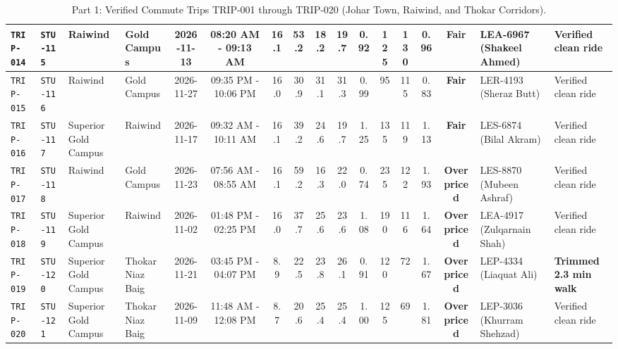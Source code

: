 \documentclass[9pt, a4paper, landscape]{article}
\begin{document}
\begin{table}[h!]
\begin{tabularx}{\textwidth}{|l|l|p{2.2cm}|p{2.3cm}|c|c|c|c|c|c|c|c|c|c|c|p{3.1cm}|X|}
\rowcolor{lightgray}\texttt{TRIP-014} & \texttt{STU-115} & Raiwind & Gold Campus & 2026-11-13 & 08:20 AM - 09:13 AM & 16.1 & 53.2 & 18.2 & 19.7 & 0.92 & 125 & 130 & 0.96 & \textcolor{accentteal}{\textbf{Fair}} & LEA-6967 (Shakeel Ahmed) & \textcolor{slate}{Verified clean ride} \\ \hline
\rowcolor{white}\texttt{TRIP-015} & \texttt{STU-116} & Raiwind & Gold Campus & 2026-11-27 & 09:35 PM - 10:06 PM & 16.0 & 30.9 & 31.1 & 31.3 & 0.99 & 95 & 115 & 0.83 & \textcolor{accentteal}{\textbf{Fair}} & LER-4193 (Sheraz Butt) & \textcolor{slate}{Verified clean ride} \\ \hline
\rowcolor{lightgray}\texttt{TRIP-016} & \texttt{STU-117} & Superior Gold Campus & Raiwind & 2026-11-17 & 09:32 AM - 10:11 AM & 16.1 & 39.2 & 24.6 & 19.7 & 1.25 & 135 & 119 & 1.13 & \textcolor{accentteal}{\textbf{Fair}} & LES-6874 (Bilal Akram) & \textcolor{slate}{Verified clean ride} \\ \hline
\rowcolor{white}\texttt{TRIP-017} & \texttt{STU-118} & Raiwind & Gold Campus & 2026-11-23 & 07:56 AM - 08:55 AM & 16.1 & 59.2 & 16.3 & 22.0 & 0.74 & 235 & 122 & 1.93 & \textcolor{accentred}{\textbf{Overpriced}} & LES-8870 (Mubeen Ashraf) & \textcolor{slate}{Verified clean ride} \\ \hline
\rowcolor{lightgray}\texttt{TRIP-018} & \texttt{STU-119} & Superior Gold Campus & Raiwind & 2026-11-02 & 01:48 PM - 02:25 PM & 16.0 & 37.7 & 25.6 & 23.6 & 1.08 & 190 & 116 & 1.64 & \textcolor{accentred}{\textbf{Overpriced}} & LEA-4917 (Zulqarnain Shah) & \textcolor{slate}{Verified clean ride} \\ \hline
\rowcolor{white}\texttt{TRIP-019} & \texttt{STU-120} & Superior Gold Campus & Thokar Niaz Baig & 2026-11-21 & 03:45 PM - 04:07 PM & 8.9 & 22.5 & 23.8 & 26.1 & 0.91 & 120 & 72 & 1.67 & \textcolor{accentred}{\textbf{Overpriced}} & LEP-4334 (Liaquat Ali) & \textcolor{accentblue}{\textbf{Trimmed 2.3 min walk}} \\ \hline
\rowcolor{lightgray}\texttt{TRIP-020} & \texttt{STU-121} & Superior Gold Campus & Thokar Niaz Baig & 2026-11-09 & 11:48 AM - 12:08 PM & 8.7 & 20.6 & 25.4 & 25.4 & 1.00 & 125 & 69 & 1.81 & \textcolor{accentred}{\textbf{Overpriced}} & LEP-3036 (Khurram Shehzad) & \textcolor{slate}{Verified clean ride} \\ \hline
\end{tabularx}
\caption{\small Part 1: Verified Commute Trips TRIP-001 through TRIP-020 (Johar Town, Raiwind, and Thokar Corridors).}
\end{table}
\end{document}
